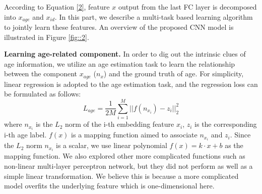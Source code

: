 \documentclass[runningheads]{llncs}
\begin{document}
According to Equation \ref{2}, feature $x$ output from the last FC layer is decomposed into $x_{age}$ and $x_{id}$. In this part, we describe a multi-task based learning algorithm to jointly learn these features. An overview of the proposed CNN model is illustrated in Figure \ref{fig::2}.


\textbf{Learning age-related component.}
In order to dig out the intrinsic clues of age information, we utilize an age estimation task to learn the relationship between the component $x_{age}$ ($n_x$) and the ground truth of age. For simplicity, linear regression is adopted to the age estimation task, and the regression loss can be formulated as follows:
\begin{equation}\label{3}
{L_{age}} = \frac{1}{{2M}}\sum\limits_{i = 1}^M {||f({n_{{x_i}}}) - {z_i}||_2^2}
\end{equation}
where $n_{x_i}$ is the $L_2$ norm of the i-th embedding feature $x_i$, $z_i$ is the corresponding i-th age label.%
$f(x)$ is a mapping function aimed to associate $n_{x_i}$ and $z_i$. Since the $L_2$ norm $n_{x_i}$ is a scalar, we use 
linear polynomial $f(x) = k \cdot x + b$ as the mapping function. We also explored other more complicated functions such as non-linear multi-layer perceptron network, but they did not perform as well as a simple linear transformation. We believe this is because a more complicated model overfits the underlying feature which is one-dimensional here.
\end{document}
